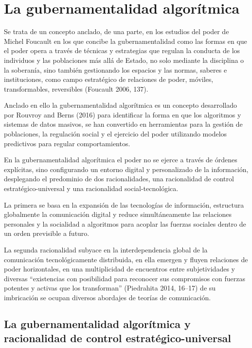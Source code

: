 \documentclass[
]{interact}
\begin{document}
\section{La gubernamentalidad
algorítmica}\label{la-gubernamentalidad-algoruxedtmica}

Se trata de un concepto anclado, de una parte, en los estudios del poder
de Michel Foucault en los que concibe la gubernamentalidad como las
formas en que el poder opera a través de técnicas y estrategias que
regulan la conducta de los individuos y las poblaciones más allá de
Estado, no solo mediante la disciplina o la soberanía, sino también
gestionando los espacios y las normas, saberes e instituciones, como
campo estratégico de relaciones de poder, móviles, transformables,
reversibles (Foucault 2006, 137).

Anclado en ello la gubernamentalidad algorítmica es un concepto
desarrollado por Rouvroy and Berns (2016) para identificar la forma en
que los algoritmos y sistemas de datos masivos, se han convertido en
herramientas para la gestión de poblaciones, la regulación social y el
ejercicio del poder utilizando modelos predictivos para regular
comportamientos.

En la gubernamentalidad algorítmica el poder no se ejerce a través de
órdenes explícitas, sino configurando un entorno digital y personalizado
de la información, desplegando el predominio de dos racionalidades, una
racionalidad de control estratégico-universal y una racionalidad
social-tecnológica.

La primera se basa en la expansión de las tecnologías de información,
estructura globalmente la comunicación digital y reduce simultáneamente
las relaciones personales y la socialidad a algoritmos para acoplar las
fuerzas sociales dentro de un orden previsible a futuro.

La segunda racionalidad subyace en la interdependencia global de la
comunicación tecnológicamente distribuida, en ella emergen y fluyen
relaciones de poder horizontales, en una multiplicidad de encuentros
entre subjetividades y diversas ``existencias con posibilidad para
reconocer sus compromisos con fuerzas potentes y activas que los
transforman'' (Piedrahita 2014, 16--17) de su imbricación se ocupan
diversos abordajes de teorías de comunicación.

\subsection{La gubernamentalidad algorítmica y racionalidad de control
estratégico-universal}\label{la-gubernamentalidad-algoruxedtmica-y-racionalidad-de-control-estratuxe9gico-universal}
\end{document}
